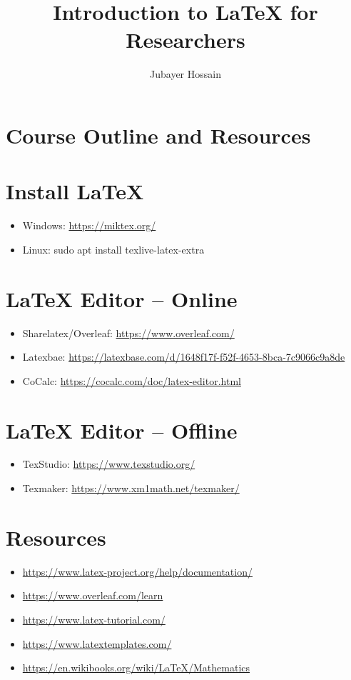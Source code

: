 \documentclass[a4paper, 12pt]{article}
\title{Introduction to {\LaTeX} for Researchers}
\author{\LARGE Jubayer Hossain}
\begin{document}
	\maketitle 
	
	
\section*{\LARGE Course Outline and Resources}

\section*{Install \LaTeX} 
\begin{itemize}
	\item Windows: \url{https://miktex.org/}
	\item Linux: sudo apt install texlive-latex-extra
\end{itemize}

\section*{{\LaTeX} Editor -- Online}
\begin{itemize}
	\item Sharelatex/Overleaf: \url{https://www.overleaf.com/}
	\item Latexbae: 
	\url{https://latexbase.com/d/1648f17f-f52f-4653-8bca-7c9066c9a8de}
	\item CoCalc: \url{https://cocalc.com/doc/latex-editor.html}
\end{itemize}

\section*{{\LaTeX} Editor -- Offline}
\begin{itemize}
	\item TexStudio: \url{https://www.texstudio.org/}
	\item Texmaker: \url{https://www.xm1math.net/texmaker/}
	
\end{itemize}

\section*{Resources} 
\begin{itemize}
	\item \url{https://www.latex-project.org/help/documentation/}
	\item \url{https://www.overleaf.com/learn}
	\item \url{https://www.latex-tutorial.com/}
	\item \url{https://www.latextemplates.com/} 
	\item \url{https://en.wikibooks.org/wiki/LaTeX/Mathematics}
\end{itemize}
\end{document}
